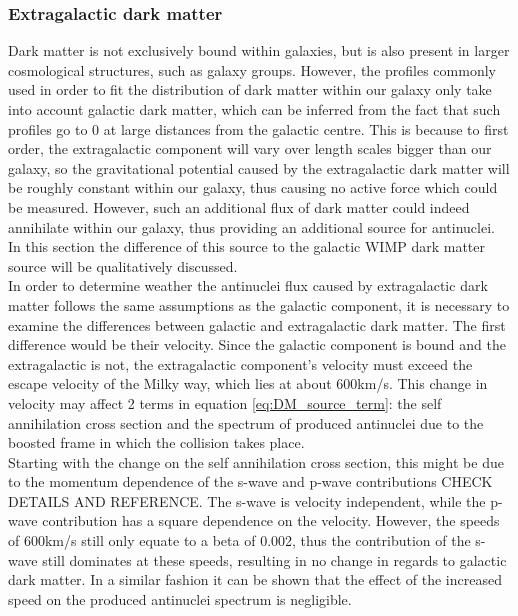 \subsubsection{Extragalactic dark matter}
Dark matter is not exclusively bound within galaxies, but is also present in larger cosmological structures, such as galaxy groups. However, the profiles commonly used in order to fit the distribution of dark matter within our galaxy only take into account galactic dark matter, which can be inferred from the fact that such profiles go to 0 at large distances from the galactic centre. This is because to first order, the extragalactic component will vary over length scales bigger than our galaxy, so the gravitational potential caused by the extragalactic dark matter will be roughly constant within our galaxy, thus causing no active force which could be measured. However, such an additional flux of dark matter could indeed annihilate within our galaxy, thus providing an additional source for antinuclei. In this section the difference of this source to the galactic WIMP dark matter source will be qualitatively discussed. \\ 

In order to determine weather the antinuclei flux caused by extragalactic dark matter follows the same assumptions as the galactic component, it is necessary to examine the differences between galactic and extragalactic dark matter. The first difference would be their velocity. Since the galactic component is bound and the extragalactic is not, the extragalactic component's velocity must exceed the escape velocity of the Milky way, which lies at about 600km/s. This change in velocity may affect 2 terms in equation \ref{eq:DM_source_term}: the self annihilation cross section and the spectrum of produced antinuclei due to the boosted frame in which the collision takes place. \\
Starting with the change on the self annihilation cross section, this might be due to the momentum dependence of the s-wave and p-wave contributions CHECK DETAILS AND REFERENCE. The s-wave is velocity independent, while the p-wave contribution has a square dependence on the velocity. However, the speeds of 600km/s still only equate to a beta of 0.002, thus the contribution of the s-wave still dominates at these speeds, resulting in no change in regards to galactic dark matter. In a similar fashion it can be shown that the effect of the increased speed on the produced antinuclei spectrum is negligible. \\

